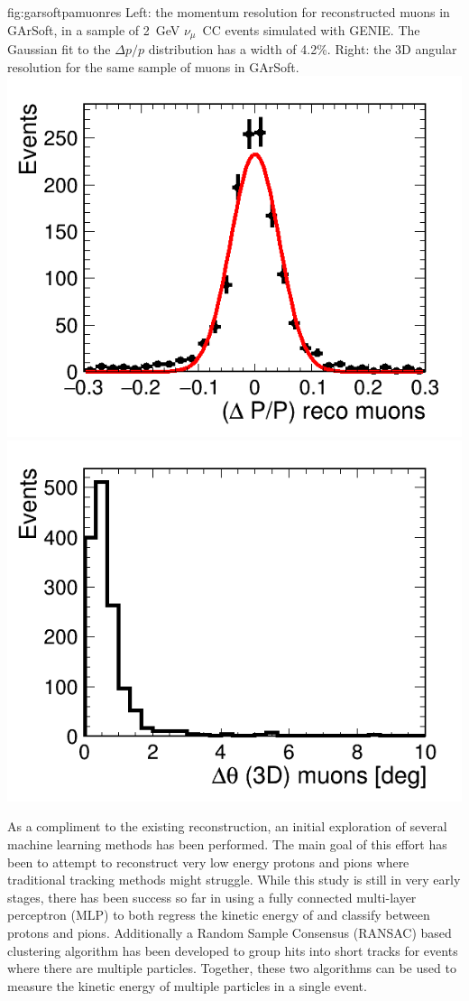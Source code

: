 \begin{dunefigure}{fig:garsoftpamuonres}
{Left: the momentum resolution for reconstructed muons in GArSoft, in a sample of 2~GeV $\nu_\mu$~CC events simulated with GENIE.  The Gaussian fit to the $\Delta p/p$ distribution has a width of 4.2\%. Right:  the 3D angular resolution for the same sample of muons in GArSoft.}
\includegraphics[width=0.49\columnwidth]{graphics/dpmuon.png}\includegraphics[width=0.49\columnwidth]{graphics/anglediffmuon.png} 
\end{dunefigure}

\label{sec:TPC_ML}                                                     

As a compliment to the existing reconstruction, an initial exploration of several machine learning methods has been performed.
The main goal of this effort has been to attempt to reconstruct very low energy protons and pions where traditional           
tracking methods might struggle.   
While this study is still in very early stages, there has been success so far in using a fully connected multi-layer perceptron (MLP) to both regress
the kinetic energy of and classify between protons and pions.  Additionally a Random Sample Consensus (RANSAC) based          
clustering algorithm has been developed to group hits into short tracks for events where there are multiple particles.        
Together, these two algorithms can be used to measure the kinetic energy of multiple particles in a single event.             

